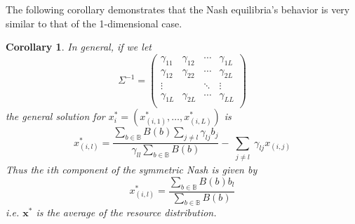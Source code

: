 \documentclass{article}
\newtheorem{corollary}{Corollary}[theorem]
\newcommand {\B}{\mathbb{B}}
\begin{document}
            The following corollary demonstrates that the Nash equilibria's behavior is very similar to that of the 1-dimensional case. 
            \begin{corollary}
                In general, if we let 
                \begin{equation}
                    \Sigma^{-1}=\begin{pmatrix}
                        \gamma_{11}& \gamma_{12} & \cdots & \gamma_{1L} \\ %
                        \gamma_{12}& \gamma_{22} & \cdots & \gamma_{2L} \\ %
                        \vdots &  & \ddots & \vdots \\ %
                        \gamma_{1L}& \gamma_{2L} & \cdots & \gamma_{LL} \\ %
                    \end{pmatrix}
                \end{equation}
                the general solution for $x_{i}^{*}=(x_{(i,1)}^*,\dots,x_{(i,L)}^*)$ is 
                \begin{equation}
                    x_{(i,l)}^*=\frac{\sum_{b\in \B}B(b)\sum_{j\neq l}\gamma_{lj}b_{j}}{\gamma_{ll}\sum_{b\in \B}B(b)}-\sum_{\substack{j\neq l}}\gamma_{lj}x_{(i,j)}
                \end{equation}
                Thus the $i$th component of the symmetric Nash is given by 
                \begin{equation}
                    x_{(i,l)}^*=\frac{\sum_{b\in \B}B(b) b_{l}}{\sum_{b\in \B}B(b)}
                \end{equation}
                 i.e. $\mathbf{x}^{*}$ is the average of the resource distribution.
            \end{corollary}
\end{document}
